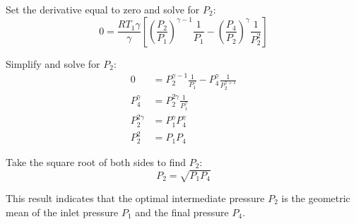 \documentclass[a4paper,12pt]{article} %
\begin{document}
Set the derivative equal to zero and solve for \( P_2 \):
\begin{equation}
0 = \frac{RT_1 \gamma}{\gamma} \left[ \left( \frac{P_2}{P_1} \right)^{\gamma-1} \frac{1}{P_1} - \left( \frac{P_4}{P_2} \right)^{\gamma} \frac{1}{P_2^2} \right]
\end{equation}

Simplify and solve for \( P_2 \):
\begin{align*}
0 &= P_2^{\gamma-1} \frac{1}{P_1^\gamma} - P_4^\gamma \frac{1}{P_2^{\gamma+1}} \\
P_4^\gamma &= P_2^{2\gamma} \frac{1}{P_1^\gamma} \\
P_2^{2\gamma} &= P_1^\gamma P_4^\gamma \\
P_2^2 &= P_1 P_4
\end{align*}

Take the square root of both sides to find \( P_2 \):
\begin{equation}
P_2 = \sqrt{P_1 P_4}
\end{equation}

This result indicates that the optimal intermediate pressure \( P_2 \) is the geometric mean of the inlet pressure \( P_1 \) and the final pressure \( P_4 \).
\end{document}
